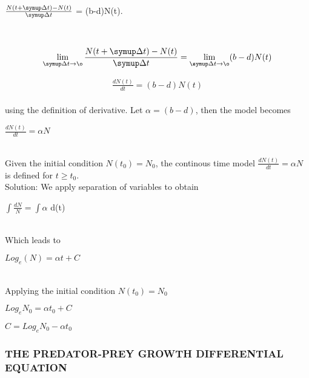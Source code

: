 \documentclass[a4paper,12pt]{report}
\numberwithin{equation}{section}
\begin{document}
\begin{center}
$\frac{N(t+\symup\Delta t) - N(t)}{\symup\Delta t}$ = (b-d)N(t).
\end{center}
\\

\begin{flushleft}
$$\lim_{\symup\Delta t\to\o} \frac{N(t+\symup\Delta t) - N(t)}{\symup\Delta t} = \lim_{\symup\Delta t\to\o} (b-d)N(t)$$
\end{flushleft}

\begin{align*}
\frac{dN(t)}{dt} = (b-d)N(t)
\end{align*}
\\
using the definition of derivative. Let $\alpha = (b-d)$, then the model becomes\\


\begin{center}
$\frac{dN(t)}{dt} = \alpha N$
\end{center}

\\
   Given the initial condition $N(t_0) = N_0$, the continous time model $\frac{dN(t)}{dt} = \alpha N$ is defined for $t \geq t_0$.
\\
Solution: We apply separation of variables to obtain \\

  
	\begin{center}
	$\int \frac{dN}{N} = \int \alpha$ d(t)
	\end{center}
\\
Which leads to\\

\begin{center}
$Log_e(N) = \alpha t + C$
\end{center}
\\
Applying the initial condition $N(t_0) = N_0$\\
\begin{center}
$Log_e N_0 = \alpha t_0 + C$
\end{center}

\begin{center}
\Longrightarrow $C = Log_e N_0 - \alpha t_0$
\end{center}











\subsubsection{THE PREDATOR-PREY GROWTH DIFFERENTIAL EQUATION}
\end{document}

